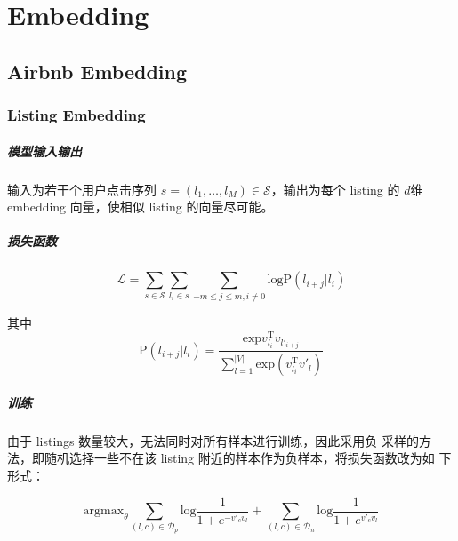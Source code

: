 \chapter{Embedding}
\section{Airbnb Embedding}

\subsection{Listing Embedding}
\paragraph{模型输入输出} 输入为若干个用户点击序列 $s=(l_1,\ldots,l_M) \in \mathcal{S}$，输出为每个
listing 的 $d$维 embedding 向量，使相似 listing 的向量尽可能。

\paragraph{损失函数}
\begin{equation}
  \mathcal{L} = \sum_{s \in \mathcal{S}} \sum_{l_i \in s} \sum_{-m \leq j \leq m, i \neq 0} \mathrm{log} \mathrm{P}(l_{i+j}|l_i)
\end{equation}

其中
\begin{equation}
  \mathrm{P}(l_{i+j}|l_i) = \frac{\mathrm{exp} v_{l_i}^{\mathrm{T}} v_{l'_{i+j}}}{\sum_{l=1}^{|V|}\mathrm{exp}(v_{l_i}^{\mathrm{T}} v'_l)}
\end{equation}

\paragraph{训练} 由于 listings 数量较大，无法同时对所有样本进行训练，因此采用负
采样的方法，即随机选择一些不在该 listing 附近的样本作为负样本，将损失函数改为如
下形式：

\begin{equation}
  \mathrm{argmax}_{\theta} \sum_{(l, c) \in \mathcal{D}_{p}} \mathrm{log} \frac{1}{1 + e^{-v'_c v_l}} + \sum_{(l, c) \in \mathcal{D}_{n}} \mathrm{log} \frac{1}{1 + e^{v'_c v_l}}
\end{equation}

